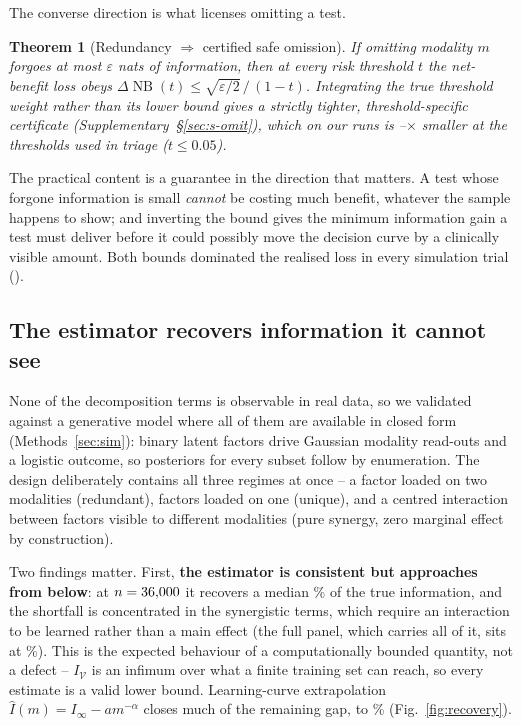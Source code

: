\documentclass[11pt]{article}
\newtheorem{theorem}{Theorem}
\theoremstyle{definition}
\theoremstyle{remark}
\DeclareMathOperator{\NB}{NB}
\newcommand{\Vc}{\mathcal{V}}
\newcommand{\IV}{I_{\Vc}}
\begin{document}
The converse direction is what licenses omitting a test.

\begin{theorem}[Redundancy $\Rightarrow$ certified safe omission]
\label{thm:omit}
If omitting modality $m$ forgoes at most $\varepsilon$ nats of information, then
at every risk threshold $t$ the net-benefit loss obeys
$\Delta\NB(t) \le \sqrt{\varepsilon/2}\,/\,(1-t)$. Integrating the true
threshold weight rather than its lower bound gives a strictly tighter,
threshold-specific certificate (Supplementary~\S\ref{sec:s-omit}), which on our runs is
\certTightenMin--\certTightenMax$\times$ smaller at the thresholds used in
triage ($t \le 0.05$).
\end{theorem}

The practical content is a guarantee in the direction that matters. A test whose
forgone information is small \emph{cannot} be costing much benefit, whatever the
sample happens to show; and inverting the bound gives the minimum information
gain a test must deliver before it could possibly move the decision curve by a
clinically visible amount. Both bounds dominated the realised loss in every
simulation trial (\simThmTwoHolds).

\subsection{The estimator recovers information it cannot see}
\label{sec:res-validation}

None of the decomposition terms is observable in real data, so we validated
against a generative model where all of them are available in closed form
(Methods~\ref{sec:sim}): binary latent factors drive Gaussian modality read-outs
and a logistic outcome, so posteriors for every subset follow by enumeration. The
design deliberately contains all three regimes at once -- a factor loaded on two
modalities (redundant), factors loaded on one (unique), and a centred
interaction between factors visible to different modalities (pure synergy, zero
marginal effect by construction).

Two findings matter. First, \textbf{the estimator is consistent but approaches
from below}: at $n=36{,}000$ it recovers a median \simRecovery\% of the true
information, and the shortfall is concentrated in the synergistic terms, which
require an interaction to be learned rather than a main effect (the full panel,
which carries all of it, sits at \simRecoveryFullPanel\%). This is the expected
behaviour of a computationally bounded quantity, not a defect -- $\IV$ is an
infimum over what a finite training set can reach, so every estimate is a valid
lower bound. Learning-curve extrapolation
$\hat I(m) = I_\infty - a m^{-\alpha}$ closes much of the remaining gap, to
\simRecoveryCorrected\% (Fig.~\ref{fig:recovery}).
\end{document}
